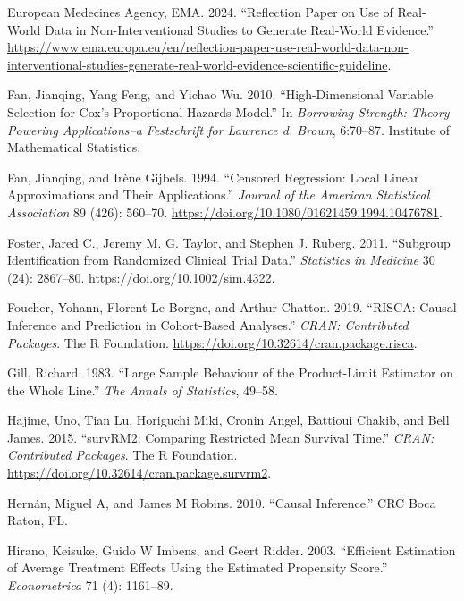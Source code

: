\documentclass[
  11pt,
  a4paper,
]{article}
\newlength{\cslhangindent}
\newenvironment{CSLReferences}[2] %
 {\begin{list}{}{%
  \setlength{\itemindent}{0pt}
  \setlength{\leftmargin}{0pt}
  \setlength{\parsep}{0pt}
  \ifodd #1
   \setlength{\leftmargin}{\cslhangindent}
   \setlength{\itemindent}{-1\cslhangindent}
  \fi
  \setlength{\itemsep}{#2\baselineskip}}}
 {\end{list}}
\theoremstyle{plain}
\theoremstyle{plain}
\theoremstyle{plain}
\theoremstyle{definition}
\theoremstyle{remark}
\begin{document}
\begin{CSLReferences}{1}{0}
European Medecines Agency, EMA. 2024. {``Reflection Paper on Use of
Real-World Data in Non-Interventional Studies to Generate Real-World
Evidence.''}
\url{https://www.ema.europa.eu/en/reflection-paper-use-real-world-data-non-interventional-studies-generate-real-world-evidence-scientific-guideline}.

Fan, Jianqing, Yang Feng, and Yichao Wu. 2010. {``High-Dimensional
Variable Selection for Cox's Proportional Hazards Model.''} In
\emph{Borrowing Strength: Theory Powering Applications--a Festschrift
for Lawrence d. Brown}, 6:70--87. Institute of Mathematical Statistics.

Fan, Jianqing, and Irène Gijbels. 1994. {``Censored Regression: Local
Linear Approximations and Their Applications.''} \emph{Journal of the
American Statistical Association} 89 (426): 560--70.
\url{https://doi.org/10.1080/01621459.1994.10476781}.

Foster, Jared C., Jeremy M. G. Taylor, and Stephen J. Ruberg. 2011.
{``Subgroup Identification from Randomized Clinical Trial Data.''}
\emph{Statistics in Medicine} 30 (24): 2867--80.
\url{https://doi.org/10.1002/sim.4322}.

Foucher, Yohann, Florent Le Borgne, and Arthur Chatton. 2019. {``RISCA:
Causal Inference and Prediction in Cohort-Based Analyses.''} \emph{CRAN:
Contributed Packages}. The R Foundation.
\url{https://doi.org/10.32614/cran.package.risca}.

Gill, Richard. 1983. {``Large Sample Behaviour of the Product-Limit
Estimator on the Whole Line.''} \emph{The Annals of Statistics}, 49--58.

Hajime, Uno, Tian Lu, Horiguchi Miki, Cronin Angel, Battioui Chakib, and
Bell James. 2015. {``survRM2: Comparing Restricted Mean Survival
Time.''} \emph{CRAN: Contributed Packages}. The R Foundation.
\url{https://doi.org/10.32614/cran.package.survrm2}.

Hernán, Miguel A, and James M Robins. 2010. {``Causal Inference.''} CRC
Boca Raton, FL.

Hirano, Keisuke, Guido W Imbens, and Geert Ridder. 2003. {``Efficient
Estimation of Average Treatment Effects Using the Estimated Propensity
Score.''} \emph{Econometrica} 71 (4): 1161--89.


\end{CSLReferences}
\end{document}
